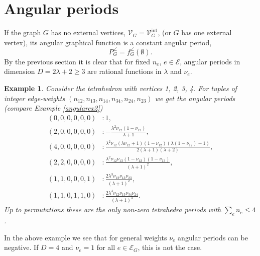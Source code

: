 \documentclass[oneside]{amsart}
\newcommand{\sE}{\mathcal{E}}
\newcommand{\sV}{\mathcal{V}}
\newcommand{\sVGint}{{\sV_G^\mathrm{int}}}
\theoremstyle{plain}
\newtheorem{ex}[thm]{Example}
\begin{document}
\section{Angular periods}\label{sectangper}
If the graph $G$ has no external vertices, $\sV_G=\sVGint$, (or $G$ has one external vertex), its angular graphical function is a constant angular period,
\begin{equation}\label{Pangdef}
P^\angle_G=f^\angle_G(\emptyset).
\end{equation}
By the previous section it is clear that for fixed $n_e$, $e\in\sE$, angular periods in dimension $D=2\lambda+2\geq3$ are rational functions in $\lambda$ and $\nu_e$.
\begin{ex}\label{angularex4}
Consider the tetrahedron with vertices 1, 2, 3, 4. For tuples of integer edge-weights $(n_{12},n_{13},n_{14},n_{34},n_{24},n_{23})$ we get the angular periods (compare Example \ref{angularex2})
\begin{align*}
 \displaystyle(0,0,0,0,0,0)&:1,\\
 \displaystyle\!(2,0,0,0,0,0)&:-\frac{\lambda^2\nu_{12}(1-\nu_{12})}{\lambda+1},\\
 \displaystyle(4,0,0,0,0,0)&:\frac{\lambda^2\nu_{12}(\lambda\nu_{12}+1)(1-\nu_{12})(\lambda(1-\nu_{12})-1)}{2(\lambda+1)(\lambda+2)},\\
 \displaystyle\!(2,2,0,0,0,0)&:\frac{\lambda^2\nu_{12}\nu_{13}(1-\nu_{12})(1-\nu_{13})}{(\lambda+1)^2},\\
 \displaystyle(1,1,0,0,0,1)&:\frac{2\lambda^3\nu_{12}\nu_{13}\nu_{23}}{(\lambda+1)^2},\\
 \displaystyle\!(1,1,0,1,1,0)&:\frac{2\lambda^4\nu_{12}\nu_{13}\nu_{34}\nu_{24}}{(\lambda+1)^3}.
\end{align*}
Up to permutations these are the only non-zero tetrahedra periods with $\sum_e n_e\leq4$.
\end{ex}
In the above example we see that for general weights $\nu_e$ angular periods can be negative. If $D=4$ and $\nu_e=1$ for all $e\in\sE_G$, this is not the case.
\end{document}
